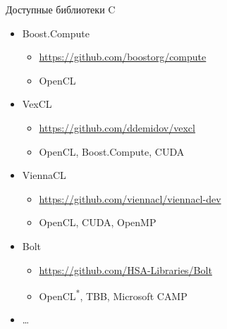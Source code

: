 \documentclass[@BEAMER_OPTIONS@]{beamer}
\newcommand{\CXX}{{\rm C}\plusplus}
\newcommand{\www}[1]{\href{#1}{#1}}
\begin{document}
\begin{frame}{Доступные библиотеки \CXX}
    \begin{itemize}
        \item Boost.Compute
            \begin{itemize}
                \item \www{https://github.com/boostorg/compute}
                \item OpenCL
            \end{itemize}
        \item VexCL
            \begin{itemize}
                \item \www{https://github.com/ddemidov/vexcl}
                \item OpenCL, Boost.Compute, CUDA
            \end{itemize}
        \item ViennaCL
            \begin{itemize}
                \item \www{https://github.com/viennacl/viennacl-dev}
                \item OpenCL, CUDA, OpenMP
            \end{itemize}
        \item Bolt
            \begin{itemize}
                \item \www{https://github.com/HSA-Libraries/Bolt}
                \item OpenCL\textsuperscript{*}, TBB, Microsoft \CXX AMP
            \end{itemize}
        \item \ldots
    \end{itemize}
\end{frame}
\end{document}
